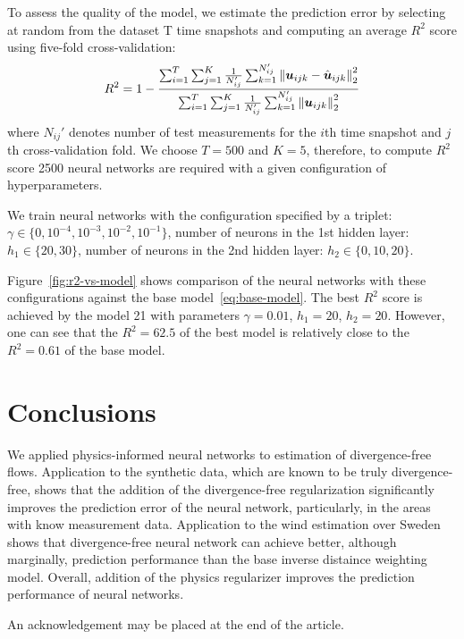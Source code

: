 \documentclass[pamm,a4paper,fleqn]{w-art}
\renewcommand{\vec}[1]{\boldsymbol{#1}}
\newcommand{\norm}[1]{\left\lVert#1\right\rVert}
\begin{document}
To assess the quality of the model, we estimate the prediction error
by selecting at random from the dataset T time snapshots and computing
an average $R^2$ score using five-fold cross-validation:
\[
  R^2 = 1 - \frac{%
    \sum_{i=1}^T \sum_{j=1}^K \frac{1}{N_{ij}'}
    \sum_{k=1}^{N_{ij}'} \norm{\vec{u}_{ijk} - \hat{\vec{u}}_{ijk}}^2_2}
  {%
    \sum_{i=1}^T \sum_{j=1}^K \frac{1}{N_{ij}'}
    \sum_{k=1}^{N_{ij}'} \norm{\vec{u}_{ijk}}^2_2}
\]
where $N_{ij}'$ denotes number of test measurements for the $i$th time snapshot
and $j$th cross-validation fold.
We choose $T=500$ and $K=5$, therefore, to compute $R^2$ score 2500 neural
networks are required with a given configuration of hyperparameters.

We train neural networks with the configuration specified by a triplet: 
$\gamma \in \{0, 10^{-4}, 10^{-3}, 10^{-2}, 10^{-1}\}$, 
number of neurons in the 1st hidden layer: $h_1 \in \{20, 30\}$,
number of neurons in the 2nd hidden layer: $h_2 \in \{0, 10, 20\}$.

Figure~\ref{fig:r2-vs-model} shows comparison of the neural networks with these
configurations against the base model~\eqref{eq:base-model}.
The best $R^2$ score is achieved by the model 21 with parameters $\gamma=0.01$,
$h_1=20$, $h_2=20$.
However, one can see that the $R^2=62.5$ of the best model is relatively close
to the $R^2=0.61$ of the base model.

\section{Conclusions}

We applied physics-informed neural networks to estimation of divergence-free
flows.
Application to the synthetic data, which are known to be truly divergence-free,
shows that the addition of the divergence-free regularization significantly
improves the prediction error of the neural network, particularly, in the areas
with know measurement data.
Application to the wind estimation over Sweden shows that divergence-free neural
network can achieve better, although marginally, prediction performance than
the base inverse distaince weighting model.
Overall, addition of the physics regularizer improves the prediction performance
of neural networks.

\begin{acknowledgement}
  An acknowledgement may be placed at the end of the article.
\end{acknowledgement}

\vspace{\baselineskip}
\end{document}
